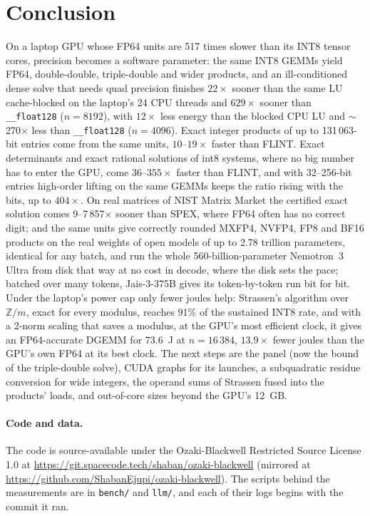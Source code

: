 \documentclass[11pt]{article}
\begin{document}
\section{Conclusion}
On a laptop GPU whose FP64 units are 517 times slower than its INT8 tensor cores, precision becomes a software parameter:
the same INT8 GEMMs yield FP64, double-double, triple-double and wider products, and an ill-conditioned dense solve that needs
quad precision finishes $22\times$ sooner than the same LU cache-blocked on the laptop's 24 CPU threads and $629\times$
sooner than \texttt{\_\_float128} ($n=8192$), with $12\times$ less energy than the blocked CPU LU and $\sim$270$\times$ less than \texttt{\_\_float128} ($n=4096$). Exact integer products of up to 131\,063-bit entries come from the same units, $10$--$19\times$ faster than FLINT. Exact determinants and exact rational solutions of int8 systems, where no big number has to enter the GPU, come $36$--$355\times$ faster than FLINT, and with 32--256-bit entries high-order lifting on the same GEMMs keeps the ratio rising with the bits, up to $404\times$. On real matrices
of NIST Matrix Market the certified exact solution comes 9--7\,857$\times$ sooner than SPEX, where FP64 often has no correct
digit; and the same units give correctly rounded MXFP4, NVFP4, FP8 and BF16 products on the real weights of open models of
up to 2.78 trillion parameters, identical for any batch, and run the whole 560-billion-parameter Nemotron~3 Ultra from disk
that way at no cost in decode, where the disk sets the pace; batched over many tokens, Jais-3-375B gives its
token-by-token run bit for bit. Under the laptop's power cap only fewer joules help: Strassen's algorithm over
$\mathbb{Z}/m$, exact for every modulus, reaches 91\% of the sustained INT8 rate, and with a 2-norm scaling that saves a
modulus, at the GPU's most efficient clock, it gives an FP64-accurate DGEMM for 73.6~J at $n=16\,384$, $13.9\times$ fewer
joules than the GPU's own FP64 at its best clock. The next steps are the panel (now the bound of the triple-double solve), CUDA graphs for its launches, a
subquadratic residue conversion for wide integers, the operand sums of Strassen fused into the products' loads, and
out-of-core sizes beyond the GPU's 12~GB.

\paragraph{Code and data.} The code is source-available under the Ozaki-Blackwell Restricted Source License 1.0 at
\url{https://git.spacecode.tech/shaban/ozaki-blackwell} (mirrored at
\url{https://github.com/ShabanEjupi/ozaki-blackwell}). The scripts behind the measurements are in \texttt{bench/} and
\texttt{llm/}, and each of their logs begins with the commit it ran.
\end{document}
